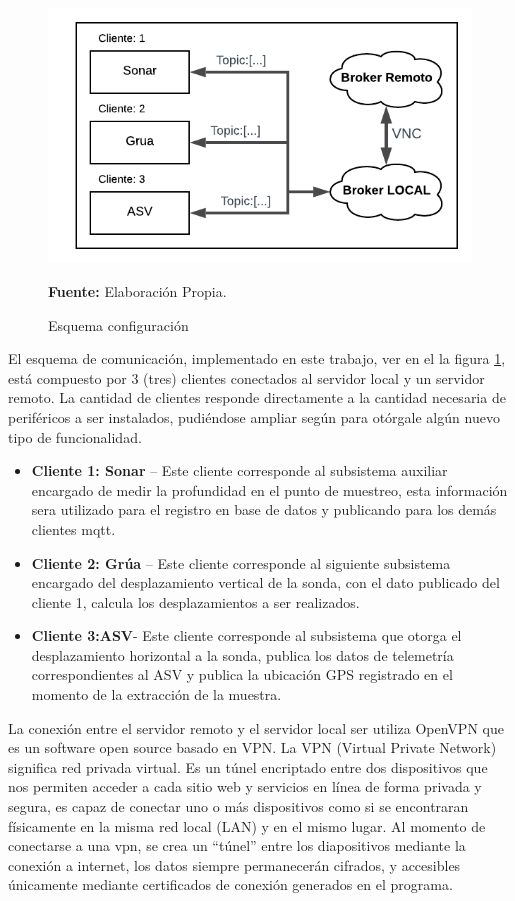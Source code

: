\begin{figure}[ht]
        \centering
        \includegraphics[scale=0.6]{Imagenes/cap3/esquemaCom.png}
        \caption[mqtt2]{Esquema configuraci\'on}\textbf{Fuente:} Elaboración Propia.
        \label{fig:mqttUtil}
    \end{figure}

El esquema de comunicaci\'on, implementado en este trabajo, ver en el la figura \ref{fig:mqttUtil}, est\'a compuesto por 3 (tres) clientes conectados al servidor local y un servidor remoto. La cantidad de clientes responde directamente a la cantidad necesaria de perif\'ericos a ser instalados, pudi\'endose ampliar seg\'un para ot\'orgale alg\'un nuevo tipo de funcionalidad. 
\begin{itemize}
    \item \textbf{Cliente 1: Sonar} – Este cliente corresponde al subsistema auxiliar encargado de medir la profundidad en el punto de muestreo,  esta informaci\'on sera utilizado para el registro en base de datos y publicando para los dem\'as clientes mqtt.
    \item \textbf{Cliente 2: Gr\'ua} – Este cliente corresponde al siguiente subsistema encargado del desplazamiento vertical de la sonda, con el dato publicado del cliente 1, calcula los desplazamientos a ser realizados.
    \item \textbf{Cliente 3:ASV}- Este cliente corresponde al subsistema que otorga el desplazamiento horizontal a la sonda, publica los datos de telemetr\'ia correspondientes al ASV y publica la ubicaci\'on GPS registrado en el momento de la extracci\'on de la muestra.
\end{itemize}

La conexi\'on entre el servidor remoto y el servidor local ser utiliza OpenVPN que es un software open source basado en VPN. La VPN (Virtual Private Network) significa red privada virtual. Es un t\'unel encriptado entre dos dispositivos que nos permiten acceder a cada sitio web y servicios en línea de forma privada y segura, es capaz de conectar uno o más dispositivos como si se encontraran físicamente en la misma red local (LAN) y en el mismo lugar\cite{arora_131_nodate}. Al momento de conectarse a una vpn, se crea un “túnel” entre los diapositivos mediante la conexi\'on a internet, los datos siempre permanecerán cifrados, y accesibles \'unicamente mediante certificados de conexi\'on generados en el programa. 

